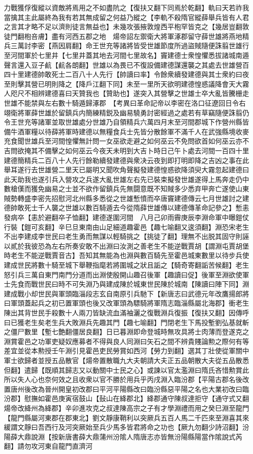 力戰獲俘復縱以資敵將焉用之不如盡阬之【復扶又翻下同焉於乾翻】軌曰天若祚我當擒其主此屬終為我有若其無成留之何益乃縱之【李軌不殺隋官縱薛舉兵皆有人君之言其才略不足以濟則徒言無益也】未幾攻張掖敦煌西平枹罕皆克之【幾居豈翻敦徒門翻枹咅膚】盡有河西五郡之地　煬帝詔左禦衛大將軍涿郡留守薛世雄將燕地精兵三萬討李密【燕因肩翻】命王世充等諸將皆受世雄節度所過盜賊隨便誅翦世雄行至河間軍於七里井【七里井蓋其地去河間七里故名】竇建德士衆惶懼悉拔諸城南遁聲言還入豆子䴚【䴚各朗翻】世雄以為畏已不復設備建德謀還襲之其處去世雄營百四十里建德帥敢死士二百八十人先行【帥讀曰率】令餘衆續發建德與其士衆約曰夜至則擊其營已明則降之【降戶江翻下同】未至一里所天欲明建德惶惑議降會天大霧人咫尺不相辨建德喜曰天贊我也【贊助也】遂突入其營擊之世雄士卒大亂皆騰栅走世雄不能禁與左右數十騎遁歸涿郡　【考異曰革命記帝以李密在洛口征遼回日令右翊衛將軍薛世雄於留鎮兵内簡練精鋭及幽易驍勇討密經過之處若有草竊隨便誅翦仍令王世充等諸軍並取世雄處分世雄乃自領精兵六萬四月末至河間郡城下作營州縣皆備牛酒軍糧以待薛將軍時建德以無糧食兵士先皆分散餘軍不滿千人在武強縣境收麥充食聞世雄兵至河間惶懼無計問一女巫欲走避之如何巫云不免問欲首如何巫云亦不吉問欲掩其不備擊之如何巫云今夜天未明到大吉卜時日己午卜處去河間一百四十里建德簡精兵二百八十人先行餘勒續發建德與衆决云夜到即打明即降之吉凶之事在此舉耳遂行去世雄營二里天已屬明又聞吹角聲擬發建德惶惑欲降須臾大霧忽起建德曰此天助我也遂引兵入營攻之兵遂大亂世雄左右先已裝束擬發世雄遂得上馬奔走仍中數槍傼而獲免幽易之士並不欲作留鎮兵先無闘意既不知賊多少悉弃甲奔亡遂使山東賊勢轉盛李密先招慰河北州縣多悉從之世雄慙憤而卒唐竇建德傳云七月世雄討之建德帥敢死士千人襲之世雄以數百騎遁去今從隋薛世雄傳以建德傳革命記參之】慙恚發病卒【恚於避翻卒子恤翻】建德遂圍河間　八月己卯雨霽庚辰李淵命軍中曝鎧仗行裝【鎧可亥翻】辛巳旦東南由山足細道趣霍邑【趣七喻翻又逡須翻】淵恐宋老生不出李建成李世民曰老生勇而無謀以輕騎挑之【挑徒了翻】理無不出脱其固守則誣以貳於我彼恐為左右所奏安敢不出淵曰汝測之善老生不能逆戰賈胡【謂淵屯賈胡堡時老生不能逆戰賈音古】吾知其無能為也淵與數百騎先至霍邑城東數里以待步兵使建成世民將數十騎至城下舉鞭指麾若將圍城之狀且詬之【騎奇寄翻詬苦候翻】老生怒引兵三萬自東門南門分道而出淵使殷開山趣召後軍【趣讀曰促】後軍至淵欲使軍士先食而戰世民曰時不可失淵乃與建成陳於城東世民陳於城南【陳讀曰陣下同】淵建成戰小却世民與軍頭臨淄段志玄自南原引兵馳下【新唐志曰武德元年改鷹揚郎將曰軍頭蓋起兵之初已置軍頭也後又改軍頭為驃騎將軍隋志臨淄縣屬北海郡】衝老生陳出其背世民手殺數十人兩刀皆缺流血滿袖灑之復戰淵兵復振【復扶又翻】因傳呼曰已獲老生矣老生兵大敗淵兵先趣其門【趣七喻翻】門閉老生下馬投塹劉弘基就斬之僵尸數里【塹七艶翻僵居良翻】日已暮淵即命登城時無攻具將士肉薄而登遂克之淵賞霍邑之功軍吏疑奴應募者不得與良人同淵曰矢石之間不辨貴賤論勲之際何有等差宜並從本勲授壬午淵引見霍邑吏民勞賞如西河【勞力到翻】選其丁壯使從軍關中軍士欲歸者並授五品散官【煬帝置散職九大夫朝請大夫正五品朝散大夫從五品散悉但翻】遣歸【既順其歸志又以動關中士民之心】或諫以官太濫淵曰隋氏吝惜勲賞此所以失人心也奈何效之且收衆以官不勝於用兵乎丙戌淵入臨汾郡【平陽古郡名後改置唐州後改為晉州開皇初改郡曰平河平陽縣改曰臨汾縣惡平陽之名也大業初改曰臨汾郡】慰撫如霍邑庚寅宿鼓山【鼔山在絳郡北】絳郡通守陳叔達拒守【通守式又翻煬帝改絳州為絳郡】辛卯進攻克之叔達陳高宗之子有才學淵禮而用之癸巳淵至龍門【龍門縣屬河東郡在郡東北】劉文靜康鞘利以突厥兵五百人馬二千匹來至淵喜其來緩謂文靜曰吾西行及河突厥始至兵少馬多皆君將命之功也【厥九勿翻少詩沼翻】汾陽薛大鼎說淵【按新唐書薛大鼎蒲州汾隂人隋唐志亦皆無汾陽縣陽當作隂說式芮翻】請勿攻河東自龍門直濟河